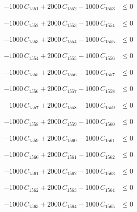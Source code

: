 \documentclass[a4paper,11pt]{article}
\begin{document}
\begin{align}
-1000\,C_{1551} + 2000\,C_{1552} - 1000\,C_{1553} &\leq 0 \nonumber
\end{align}

\begin{align}
-1000\,C_{1552} + 2000\,C_{1553} - 1000\,C_{1554} &\leq 0 \nonumber
\end{align}

\begin{align}
-1000\,C_{1553} + 2000\,C_{1554} - 1000\,C_{1555} &\leq 0 \nonumber
\end{align}

\begin{align}
-1000\,C_{1554} + 2000\,C_{1555} - 1000\,C_{1556} &\leq 0 \nonumber
\end{align}

\begin{align}
-1000\,C_{1555} + 2000\,C_{1556} - 1000\,C_{1557} &\leq 0 \nonumber
\end{align}

\begin{align}
-1000\,C_{1556} + 2000\,C_{1557} - 1000\,C_{1558} &\leq 0 \nonumber
\end{align}

\begin{align}
-1000\,C_{1557} + 2000\,C_{1558} - 1000\,C_{1559} &\leq 0 \nonumber
\end{align}

\begin{align}
-1000\,C_{1558} + 2000\,C_{1559} - 1000\,C_{1560} &\leq 0 \nonumber
\end{align}

\begin{align}
-1000\,C_{1559} + 2000\,C_{1560} - 1000\,C_{1561} &\leq 0 \nonumber
\end{align}

\begin{align}
-1000\,C_{1560} + 2000\,C_{1561} - 1000\,C_{1562} &\leq 0 \nonumber
\end{align}

\begin{align}
-1000\,C_{1561} + 2000\,C_{1562} - 1000\,C_{1563} &\leq 0 \nonumber
\end{align}

\begin{align}
-1000\,C_{1562} + 2000\,C_{1563} - 1000\,C_{1564} &\leq 0 \nonumber
\end{align}

\begin{align}
-1000\,C_{1563} + 2000\,C_{1564} - 1000\,C_{1565} &\leq 0 \nonumber
\end{align}
\end{document}
